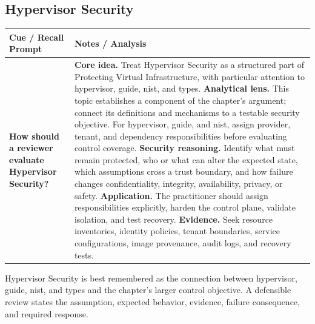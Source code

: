 \documentclass[11pt]{article}
\newcommand{\CornellHeader}{%
\rowcolor{Navy}\color{white}\bfseries Cue / Recall Prompt & \color{white}\bfseries Notes / Analysis\\\hline}
\newcommand{\CornellRow}[2]{%
\cellcolor{CueGray}\RaggedRight\textbf{#1} & \RaggedRight #2\\\hline}
\begin{document}
\subsection*{Hypervisor Security}
\begin{longtable}{>{\RaggedRight\arraybackslash}p{}|>{\RaggedRight\arraybackslash}p{}}
\CornellHeader
\CornellRow{How should a reviewer evaluate Hypervisor Security?}{\textbf{Core idea.} Treat Hypervisor Security as a structured part of Protecting Virtual Infrastructure, with particular attention to hypervisor, guide, nist, and types. \textbf{Analytical lens.} This topic establishes a component of the chapter's argument; connect its definitions and mechanisms to a testable security objective. For hypervisor, guide, and nist, assign provider, tenant, and dependency responsibilities before evaluating control coverage. \textbf{Security reasoning.} Identify what must remain protected, who or what can alter the expected state, which assumptions cross a trust boundary, and how failure changes confidentiality, integrity, availability, privacy, or safety. \textbf{Application.} The practitioner should assign responsibilities explicitly, harden the control plane, validate isolation, and test recovery. \textbf{Evidence.} Seek resource inventories, identity policies, tenant boundaries, service configurations, image provenance, audit logs, and recovery tests.}
\end{longtable}
\begin{topicsummary}
Hypervisor Security is best remembered as the connection between hypervisor, guide, nist, and types and the chapter's larger control objective. A defensible review states the assumption, expected behavior, evidence, failure consequence, and required response.
\end{topicsummary}
\end{document}
